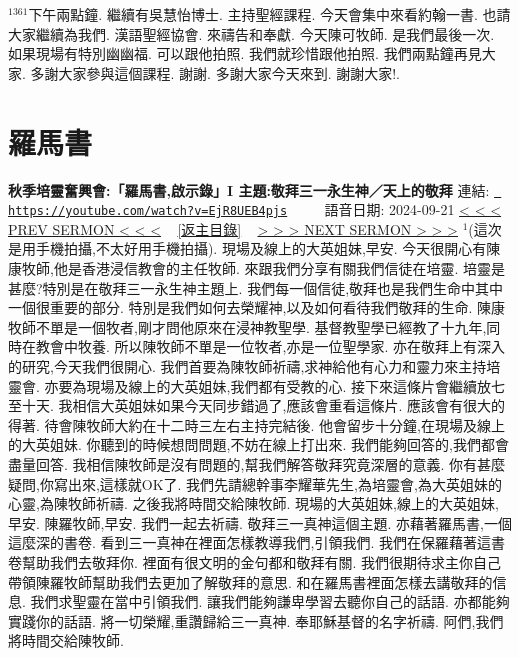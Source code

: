 \documentclass{book}
\begin{document}
$^{1361}$下午兩點鐘.
繼續有吳慧怡博士.
主持聖經課程.
今天會集中來看約翰一書.
也請大家繼續為我們.
漢語聖經協會.
來禱告和奉獻.
今天陳可牧師.
是我們最後一次.
如果現場有特別幽幽福.
可以跟他拍照.
我們就珍惜跟他拍照.
我們兩點鐘再見大家.
多謝大家參與這個課程.
謝謝.
多謝大家今天來到.
謝謝大家!.
\newpage



\section{羅馬書}
\label{sec:EjR8UEB4pjs}
\textbf{秋季培靈奮興會:「羅馬書,啟示錄」I 主題:敬拜三一永生神／天上的敬拜}
\newline
\newline
連結: \href{https://youtube.com/watch?v=EjR8UEB4pjs}{\texttt{ https://youtube.com/watch?v=EjR8UEB4pjs}} ~~~~ 語音日期: 2024-09-21 
\newline
\newline
\hyperref[sec:uvYtXSSsYt0]{\small{< < < PREV SERMON < < <}}
~
\hyperref[sec:index]{\small{[返主目錄]}}
~
\hyperref[sec:ltLox1aivp8]{\small{> > > NEXT SERMON > > >}}
\newline
\newline
$^{1}$(這次是用手機拍攝,不太好用手機拍攝).
現場及線上的大英姐妹,早安.
今天很開心有陳康牧師,他是香港浸信教會的主任牧師.
來跟我們分享有關我們信徒在培靈.
培靈是甚麼?特別是在敬拜三一永生神主題上.
我們每一個信徒,敬拜也是我們生命中其中一個很重要的部分.
特別是我們如何去榮耀神,以及如何看待我們敬拜的生命.
陳康牧師不單是一個牧者,剛才問他原來在浸神教聖學.
基督教聖學已經教了十九年,同時在教會中牧養.
所以陳牧師不單是一位牧者,亦是一位聖學家.
亦在敬拜上有深入的研究,今天我們很開心.
我們首要為陳牧師祈禱,求神給他有心力和靈力來主持培靈會.
亦要為現場及線上的大英姐妹,我們都有受教的心.
接下來這條片會繼續放七至十天.
我相信大英姐妹如果今天同步錯過了,應該會重看這條片.
應該會有很大的得著.
待會陳牧師大約在十二時三左右主持完結後.
他會留步十分鐘,在現場及線上的大英姐妹.
你聽到的時候想問問題,不妨在線上打出來.
我們能夠回答的,我們都會盡量回答.
我相信陳牧師是沒有問題的,幫我們解答敬拜究竟深層的意義.
你有甚麼疑問,你寫出來,這樣就OK了.
我們先請總幹事李耀華先生,為培靈會,為大英姐妹的心靈,為陳牧師祈禱.
之後我將時間交給陳牧師.
現場的大英姐妹,線上的大英姐妹,早安.
陳羅牧師,早安.
我們一起去祈禱.
敬拜三一真神這個主題.
亦藉著羅馬書,一個這麼深的書卷.
看到三一真神在裡面怎樣教導我們,引領我們.
我們在保羅藉著這書卷幫助我們去敬拜你.
裡面有很文明的金句都和敬拜有關.
我們很期待求主你自己帶領陳羅牧師幫助我們去更加了解敬拜的意思.
和在羅馬書裡面怎樣去講敬拜的信息.
我們求聖靈在當中引領我們.
讓我們能夠謙卑學習去聽你自己的話語.
亦都能夠實踐你的話語.
將一切榮耀,重讚歸給三一真神.
奉耶穌基督的名字祈禱.
阿們,我們將時間交給陳牧師.
\end{document}
